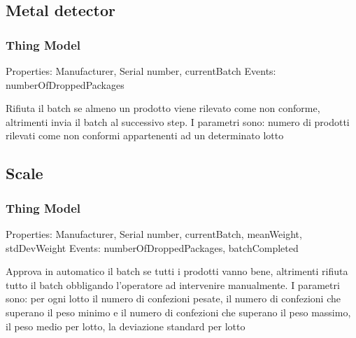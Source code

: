 \subsection{Metal detector}
\subsubsection{Thing Model}
Properties: Manufacturer, Serial number, currentBatch
Events: numberOfDroppedPackages

Rifiuta il batch se almeno un prodotto viene rilevato come non conforme, altrimenti invia il batch al successivo step.
I parametri sono:
numero di prodotti rilevati come non conformi appartenenti ad un determinato lotto

\subsection{Scale}

\subsubsection{Thing Model}
Properties: Manufacturer, Serial number, currentBatch, meanWeight, stdDevWeight
Events: numberOfDroppedPackages, batchCompleted

Approva in automatico il batch se tutti i prodotti vanno bene, altrimenti rifiuta tutto il batch obbligando l'operatore ad intervenire manualmente.
I parametri sono:
per ogni lotto il numero di confezioni pesate, il numero di confezioni che superano il peso minimo e il numero di confezioni che superano il peso massimo, il peso medio per lotto, la deviazione standard per lotto
